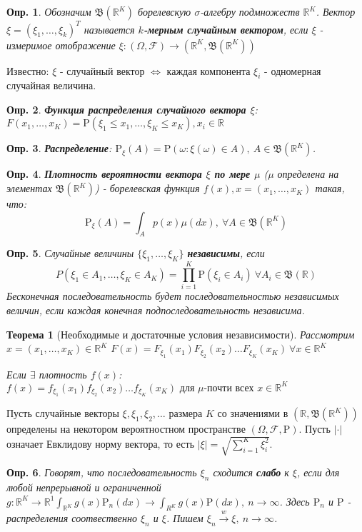 \documentclass[10pt]{article}
\newtheorem{definition}{Опр.}
\theoremstyle{theorem}
\newtheorem{theorem}{Теорема}
\newcommand\defin[1]{\textbf{#1}}
\def\R{
    \mathbb{R}
}
\def\P{
    \mathrm{P}
}
\def\F{
    \mathcal{F}
}
\def\B{
    \mathfrak{B}
}
\begin{document}
\begin{definition}
    Обозначим $\B(\R^K)$ борелевскую $\sigma$-алгебру подмножеств $\R^K$.
    Вектор $\xi = (\xi_1, \ldots, \xi_k)^T$ называется \defin{$k$-мерным случайным
    вектором}, если $\xi$ - измеримое отображение $\xi: (\Omega, \F) \rightarrow (\R^K, \B(\R^K))$
\end{definition}
    Известно: $\xi$ - случайный вектор $\Leftrightarrow$ каждая
    компонента $\xi_i$ - одномерная случайная величина.
\begin{definition}
    \defin{Функция распределения случайного вектора $\xi$}:
    $F(x_1, \ldots, x_K) = \P(\xi_1 \leq x_1, \ldots, \xi_K \leq x_K), x_i \in \R$
\end{definition}
\begin{definition}    
    \defin{Распределение}: $\P_\xi(A) = \P(\omega: \xi(\omega) \in A), \ A \in \B(\R^K)$.
\end{definition}
\begin{definition}
    \defin{Плотность вероятности вектора $\xi$ по мере $\mu$} ($\mu$ определена на элементах $\B(\R^K)$)
    - борелевская функция $f(x), x = (x_1, \ldots, x_K)$ такая, что:
    $$\P_\xi(A) = \int_Ap(x)\mu(dx), \ \forall A \in \B(\R^K)$$
\end{definition}
\begin{definition}
    Случайные величины $\{\xi_1, \ldots, \xi_K\}$ \defin{независимы}, если
    $$P(\xi_1 \in A_1, \ldots, \xi_K \in A_K) = \prod_{i = 1}^K \P(\xi_i \in A_i) \ \forall A_i \in \B(\R) $$
    Бесконечная последовательность будет последовательностью независимых величин,
    если каждая конечная подпоследовательность независима.
\end{definition}
\begin{theorem}[Необходимые и достаточные условия независимости]
    Рассмотрим $x = (x_1, \ldots, x_K) \in \R^K$
    $F(x) = F_{\xi_1}(x_1)F_{\xi_2}(x_2)\ldots F_{\xi_K}(x_K) \ \forall x \in \R^K$
    
    Если $\exists$ плотность $f(x)$:
    $f(x) = f_{\xi_1}(x_1)f_{\xi_2}(x_2)\ldots f_{\xi_K}(x_K) \mbox{ для $\mu$-почти всех } x \in \R^K$
\end{theorem}

Пусть случайные векторы $\xi, \xi_1, \xi_2, \ldots$ размера $K$ со значениями
в $(\R, \B(\R^K))$ определены на некотором вероятностном пространстве $(\Omega, \F, \P)$.
Пусть $|\cdot|$ означает Евклидову норму вектора, то есть $|\xi| = \sqrt{\sum_{i=1}^K\xi_i^2}$.
\begin{definition}
    Говорят, что последовательность ${\xi_n}$ сходится \defin{слабо} к $\xi$, если
    для любой непрерывной и ограниченной $g: \R^K \rightarrow \R^1 \int_{\R^K}g(x)\P_{n}(dx) \rightarrow \int_{R^K}g(x) \P(dx) ,\ n \rightarrow \infty$.
    Здесь $\P_n$ и $\P$ - распределения соотвественно $\xi_n$ и $\xi$.
    Пишем $\xi_n \xrightarrow{w} \xi,\ n \rightarrow \infty$.
\end{definition}
\end{document}
